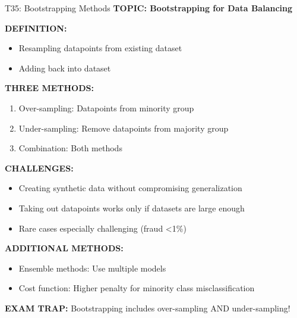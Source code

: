 \documentclass[8pt]{beamer}
\begin{document}
	\begin{frame}{T35: Bootstrapping Methods}
		\fontsize{6.5}{7.5}\selectfont
		\textbf{TOPIC: Bootstrapping for Data Balancing}
		
		\vspace{0.1cm}
		\textbf{DEFINITION:}
		\begin{itemize}
			\item Resampling datapoints from existing dataset
			\item Adding back into dataset
		\end{itemize}
		
		\vspace{0.1cm}
		\textbf{THREE METHODS:}
		\begin{enumerate}
			\item \textcolor{myblue}{Over-sampling:} Datapoints from minority group
			\item \textcolor{myblue}{Under-sampling:} Remove datapoints from majority group
			\item \textcolor{myblue}{Combination:} Both methods
		\end{enumerate}
		
		\vspace{0.1cm}
		\textbf{CHALLENGES:}
		\begin{itemize}
			\item Creating synthetic data without compromising generalization
			\item Taking out datapoints works only if datasets are large enough
			\item Rare cases especially challenging (fraud <1\%)
		\end{itemize}
		
		\vspace{0.1cm}
		\textbf{ADDITIONAL METHODS:}
		\begin{itemize}
			\item Ensemble methods: Use multiple models
			\item Cost function: Higher penalty for minority class misclassification
		\end{itemize}
		
		\textcolor{myred}{\textbf{EXAM TRAP:}} Bootstrapping includes \textcolor{myblue}{over-sampling AND under-sampling}!
	\end{frame}
	
\end{document}
